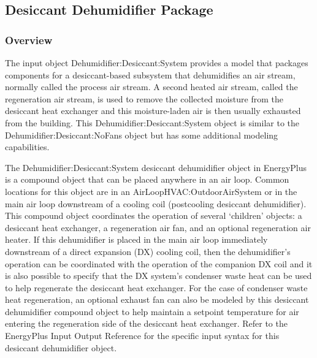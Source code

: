 \subsection{Desiccant Dehumidifier Package}\label{desiccant-dehumidifier-package}

\subsubsection{Overview}\label{overview-7}

The input object Dehumidifier:Desiccant:System provides a model that packages components for a desiccant-based subsystem that dehumidifies an air stream, normally called the process air stream. A second heated air stream, called the regeneration air stream, is used to remove the collected moisture from the desiccant heat exchanger and this moisture-laden air is then usually exhausted from the building. This Dehumidifier:Desiccant:System object is similar to the Dehumidifier:Desiccant:NoFans object but has some additional modeling capabilities.

The Dehumidifier:Desiccant:System desiccant dehumidifier object in EnergyPlus is a compound object that can be placed anywhere in an air loop. Common locations for this object are in an AirLoopHVAC:OutdoorAirSystem or in the main air loop downstream of a cooling coil (postcooling desiccant dehumidifier). This compound object coordinates the operation of several `children' objects: a desiccant heat exchanger, a regeneration air fan, and an optional regeneration air heater. If this dehumidifier is placed in the main air loop immediately downstream of a direct expansion (DX) cooling coil, then the dehumidifier's operation can be coordinated with the operation of the companion DX coil and it is also possible to specify that the DX system's condenser waste heat can be used to help regenerate the desiccant heat exchanger. For the case of condenser waste heat regeneration, an optional exhaust fan can also be modeled by this desiccant dehumidifier compound object to help maintain a setpoint temperature for air entering the regeneration side of the desiccant heat exchanger. Refer to the EnergyPlus Input Output Reference for the specific input syntax for this desiccant dehumidifier object.

